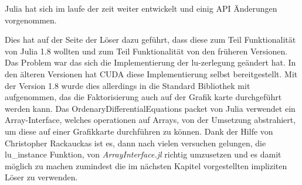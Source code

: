 Julia hat sich im laufe der zeit weiter entwickelt und einig API Änderungen vorgenommen.

Dies hat auf der Seite der Löser dazu geführt, dass diese zum Teil Funktionalität von Julia 1.8 wollten 
und zum Teil Funktionalität von den früheren Versionen.
Das Problem war das sich die Implementierung der lu-zerlegung geändert hat. %
In den älteren Versionen hat CUDA diese Implementierung selbst bereitgestellt.
Mit der Version 1.8 wurde dies allerdings in die Standard Bibliothek mit aufgenommen, das die Faktorisierung 
auch auf der Grafik karte durchgeführt werden kann.
Das OrdenaryDifferentialEquations packet von Julia verwendet 
ein Array-Interface, welches operationen auf Arrays, 
von der Umsetzung abstrahiert, um diese auf einer Grafikkarte durchführen zu können.
Dank der Hilfe von Christopher Rackauckas ist es, dann nach vielen versuchen gelungen, die lu\_instance Funktion, von \textit{ArrayInterface.jl} richtig umzusetzen 
und es damit möglich zu machen zumindest die im nächsten Kapitel vorgestellten impliziten Löser zu verwenden.


